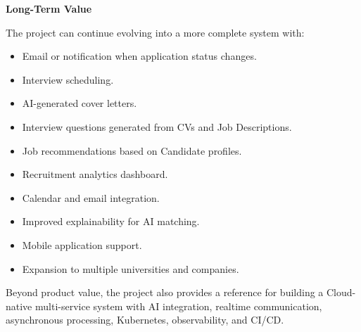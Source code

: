 \vspace{0.5em}\noindent\textbf{Long-Term Value}\par

The project can continue evolving into a more complete system with:

\begin{itemize}
\tightlist
\item
  Email or notification when application status changes.
\item
  Interview scheduling.
\item
  AI-generated cover letters.
\item
  Interview questions generated from CVs and Job Descriptions.
\item
  Job recommendations based on Candidate profiles.
\item
  Recruitment analytics dashboard.
\item
  Calendar and email integration.
\item
  Improved explainability for AI matching.
\item
  Mobile application support.
\item
  Expansion to multiple universities and companies.
\end{itemize}

Beyond product value, the project also provides a reference for building
a Cloud-native multi-service system with AI integration, realtime
communication, asynchronous processing, Kubernetes, observability, and
CI/CD.
